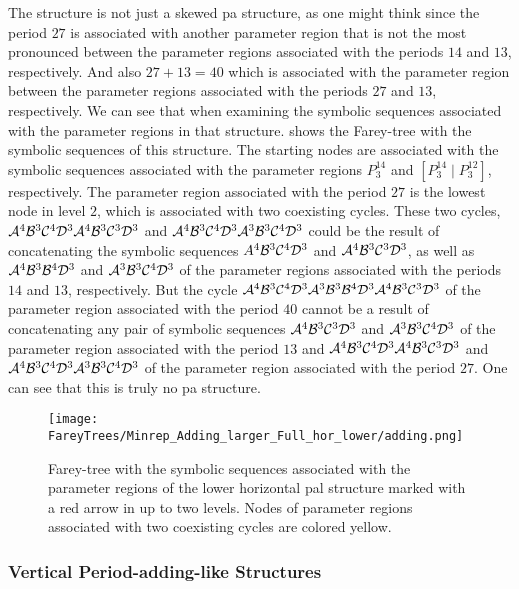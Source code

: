 The structure is not just a skewed \gls{pa} structure, as one might think since the period $27$ is associated with another parameter region that is not the most pronounced between the parameter regions associated with the periods $14$ and $13$, respectively.
And also $27 + 13 = 40$ which is associated with the parameter region between the parameter regions associated with the periods $27$ and $13$, respectively.
We can see that when examining the symbolic sequences associated with the parameter regions in that structure.
 shows the Farey-tree with the symbolic sequences of this structure.
The starting nodes are associated with the symbolic sequences associated with the parameter regions $P^{14}_3$ and $\left[P^{14}_3 \mid P^{12}_3\right]$, respectively.
The parameter region associated with the period $27$ is the lowest node in level $2$, which is associated with two coexisting cycles.
These two cycles, $\mathcal{A}^4\mathcal{B}^3\mathcal{C}^4\mathcal{D}^3\mathcal{A}^4\mathcal{B}^3\mathcal{C}^3\mathcal{D}^3$ and $\mathcal{A}^4\mathcal{B}^3\mathcal{C}^4\mathcal{D}^3\mathcal{A}^3\mathcal{B}^3\mathcal{C}^4\mathcal{D}^3$ could be the result of concatenating the symbolic sequences $A^4\mathcal{B}^3\mathcal{C}^4\mathcal{D}^3$ and $\mathcal{A}^4\mathcal{B}^3\mathcal{C}^3\mathcal{D}^3$, as well as $\mathcal{A}^4\mathcal{B}^3\mathcal{B}^4\mathcal{D}^3$ and $\mathcal{A}^3\mathcal{B}^3\mathcal{C}^4\mathcal{D}^3$ of the parameter regions associated with the periods $14$ and $13$, respectively.
But the cycle $\mathcal{A}^4\mathcal{B}^3\mathcal{C}^4\mathcal{D}^3\mathcal{A}^3\mathcal{B}^3\mathcal{B}^4\mathcal{D}^3\mathcal{A}^4\mathcal{B}^3\mathcal{C}^3\mathcal{D}^3$ of the parameter region associated with the period $40$ cannot be a result of concatenating any pair of symbolic sequences $\mathcal{A}^4\mathcal{B}^3\mathcal{C}^3\mathcal{D}^3$ and $\mathcal{A}^3\mathcal{B}^3\mathcal{C}^4\mathcal{D}^3$ of the parameter region associated with the period $13$ and $\mathcal{A}^4\mathcal{B}^3\mathcal{C}^4\mathcal{D}^3\mathcal{A}^4\mathcal{B}^3\mathcal{C}^3\mathcal{D}^3$ and $\mathcal{A}^4\mathcal{B}^3\mathcal{C}^4\mathcal{D}^3\mathcal{A}^3\mathcal{B}^3\mathcal{C}^4\mathcal{D}^3$ of the parameter region associated with the period $27$.
One can see that this is truly no \gls{pa} structure.

\begin{figure}
	\centering
	\texttt{[image: FareyTrees/Minrep\_Adding\_larger\_Full\_hor\_lower/adding.png]}
	\caption[Farey-tree with the symbolic sequences of a horizontal  structure]{
		Farey-tree with the symbolic sequences associated with the parameter regions of the lower horizontal \gls{pal} structure marked with a red arrow in  up to two levels.
		Nodes of parameter regions associated with two coexisting cycles are colored yellow.
	}
	\label{fig:add.add.like.hor.tree}
\end{figure}

\subsubsection{Vertical Period-adding-like Structures}

